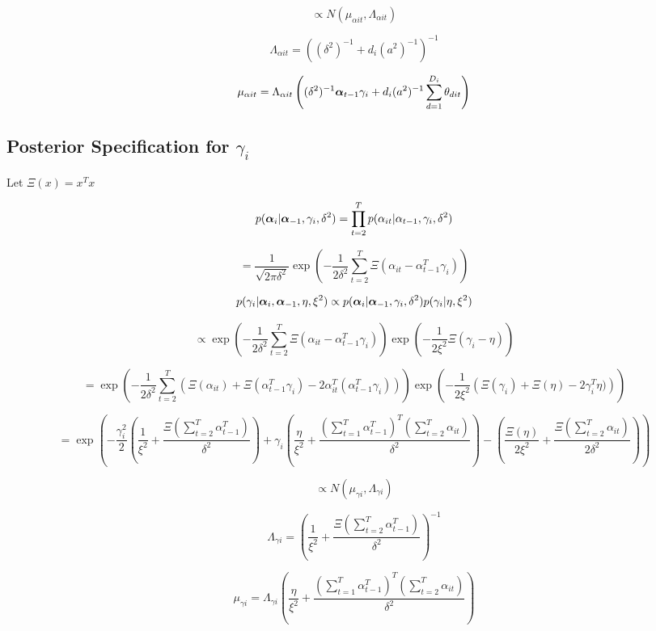\documentclass[a4paper]{article}
\begin{document}
\[\propto N(\mu_{\alpha i t}, \Lambda_{\alpha i t})\]

\[\Lambda_{\alpha i t} = ((\delta^2)^{-1} + d_i (a^2)^{-1})^{-1}\]

\[\mu_{\alpha i t} = \Lambda_{\alpha i t} \left((\delta^2)^{-1}\text{\boldmath$\alpha$}_{t-1} \gamma_i + d_i (a^2)^{-1} \sum_{d=1}^{D_i} \theta_{dit}\right) \]

\subsection{Posterior Specification for $\gamma_i$}

Let $\Xi(x) = x^Tx$

\[p(\text{\boldmath$\alpha$}_i | \text{\boldmath$\alpha$}_{-1}, \gamma_i, \delta^2) = \prod_{t=2}^T p(\alpha_{it} | \alpha_{t-1}, \gamma_i, \delta^2)\]

\[= \frac{1}{\sqrt{2 \pi \delta^2}} \exp\left(-\frac{1}{2\delta^2} \sum_{t=2}^T \Xi\left(\alpha_{it} - \alpha_{t-1}^T \gamma_i\right)\right)\]

\[p(\gamma_i | \text{\boldmath$\alpha$}_{i}, \text{\boldmath$\alpha$}_{-1}, \eta, \xi^2) \propto p(\text{\boldmath$\alpha$}_i | \text{\boldmath$\alpha$}_{-1}, \gamma_i, \delta^2) p(\gamma_i | \eta, \xi^2)\]

\[\propto \exp\left(-\frac{1}{2 \delta^2} \sum_{t=2}^T \Xi\left(\alpha_{it} - \alpha_{t-1}^T \gamma_i\right)\right) \exp\left(-\frac{1}{2\xi^2}\Xi\left(\gamma_i - \eta\right)\right)\]

\[= \exp\left(-\frac{1}{2 \delta^2} \sum_{t=2}^T \left(\Xi(\alpha_{it}) + \Xi\left(\alpha_{t-1}^T \gamma_i\right) - 2 \alpha_{it}^T (\alpha_{t-1}^T \gamma_i) \right)\right) \exp\left(-\frac{1}{2\xi^2}\left(\Xi(\gamma_i) + \Xi(\eta) - 2 \gamma_i^T \eta)\right)\right)\]

\[= \exp\left(- \frac{\gamma_i^2}{2}\left(\frac{1}{\xi^2} + \frac{\Xi\left(\sum_{t=2}^T \alpha_{t-1}^T\right)}{\delta^2}\right) + \gamma_i \left(\frac{\eta}{\xi^2} + \frac{\left(\sum_{t=1}^T \alpha_{t-1}^T\right)^T \left(\sum_{t=2}^T \alpha_{it}\right)}{\delta^2}\right) - \left(\frac{\Xi(\eta)}{2\xi^2} + \frac{\Xi\left(\sum_{t=2}^T \alpha_{it}\right)}{2 \delta^2}\right)\right)\]

\[\propto N(\mu_{\gamma i}, \Lambda_{\gamma i})\]

\[\Lambda_{\gamma i} = \left(\frac{1}{\xi^2}+ \frac{\Xi\left(\sum_{t=2}^T \alpha_{t-1}^T\right)}{\delta^2}\right)^{-1}\]

\[\mu_{\gamma i} = \Lambda_{\gamma i} \left(\frac{\eta}{\xi^2} + \frac{\left(\sum_{t=1}^T \alpha_{t-1}^T\right)^T \left(\sum_{t=2}^T \alpha_{it}\right)}{\delta^2}\right)\]
\end{document}
